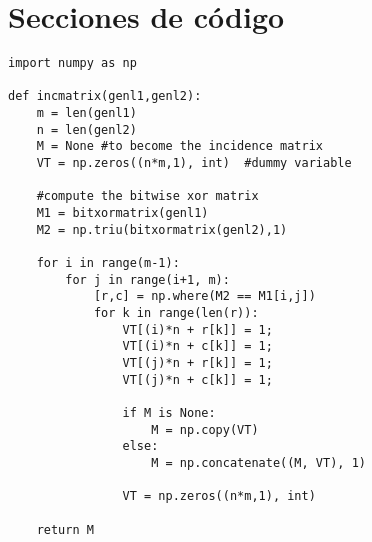 \section{Secciones de código}


\begin{lstlisting}
import numpy as np
    
def incmatrix(genl1,genl2):
    m = len(genl1)
    n = len(genl2)
    M = None #to become the incidence matrix
    VT = np.zeros((n*m,1), int)  #dummy variable
    
    #compute the bitwise xor matrix
    M1 = bitxormatrix(genl1)
    M2 = np.triu(bitxormatrix(genl2),1) 

    for i in range(m-1):
        for j in range(i+1, m):
            [r,c] = np.where(M2 == M1[i,j])
            for k in range(len(r)):
                VT[(i)*n + r[k]] = 1;
                VT[(i)*n + c[k]] = 1;
                VT[(j)*n + r[k]] = 1;
                VT[(j)*n + c[k]] = 1;
                
                if M is None:
                    M = np.copy(VT)
                else:
                    M = np.concatenate((M, VT), 1)
                
                VT = np.zeros((n*m,1), int)
    
    return M
\end{lstlisting}

